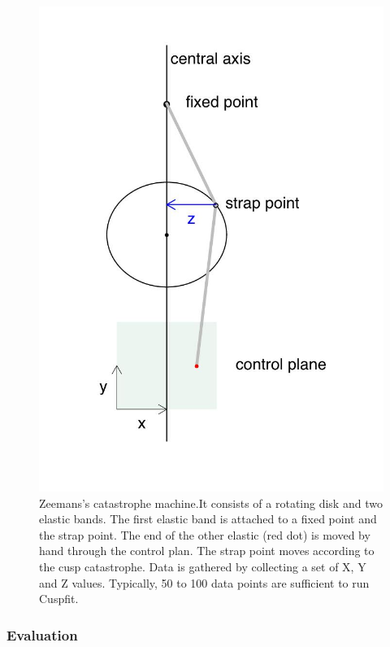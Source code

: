 \documentclass[
  a4paper,
  DIV=11,
  numbers=noendperiod]{scrreprt}
\begin{document}
\begin{figure}

{\centering \includegraphics{media/ch3/image26.jpg}

}

\caption{\label{fig-ch3-img26-old-38}Zeemans's catastrophe machine.It
consists of a rotating disk and two elastic bands. The first elastic
band is attached to a fixed point and the strap point. The end of the
other elastic (red dot) is moved by hand through the control plan. The
strap point moves according to the cusp catastrophe. Data is gathered by
collecting a set of X, Y and Z values. Typically, 50 to 100 data points
are sufficient to run Cuspfit.}

\end{figure}

\hypertarget{sec-Evaluation}{%
\subsubsection{Evaluation}\label{sec-Evaluation}}
\end{document}
